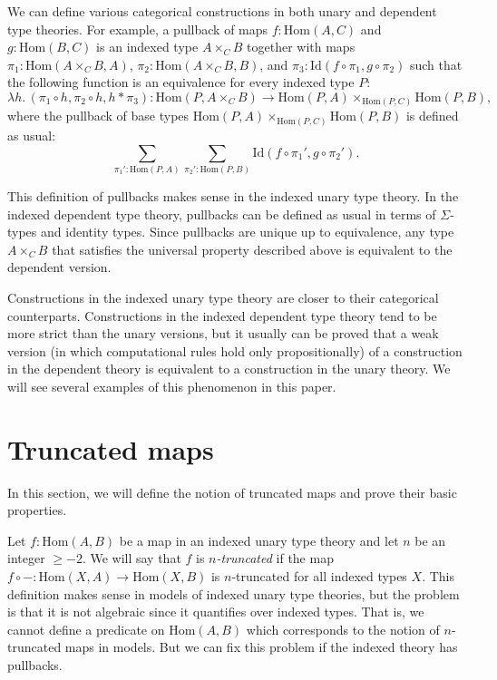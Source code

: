 \documentclass[reqno]{mscs}
\newcommand{\fs}[1]{\mathrm{#1}}
\newcommand{\Hom}{\fs{Hom}}
\newcommand{\Id}{\fs{Id}}
\numberwithin{figure}{section}
\begin{document}
We can define various categorical constructions in both unary and dependent type theories.
For example, a pullback of maps $f : \Hom(A,C)$ and $g : \Hom(B,C)$ is an indexed type $A \times_C B$ together with maps $\pi_1 : \Hom(A \times_C B, A)$, $\pi_2 : \Hom(A \times_C B, B)$, and $\pi_3 : \Id(f \circ \pi_1, g \circ \pi_2)$
such that the following function is an equivalence for every indexed type $P$:
\[ \lambda h.\,(\pi_1 \circ h, \pi_2 \circ h, h * \pi_3) : \Hom(P, A \times_C B) \to \Hom(P,A) \times_{\Hom(P,C)} \Hom(P,B), \]
where the pullback of base types $\Hom(P,A) \times_{\Hom(P,C)} \Hom(P,B)$ is defined as usual:
\[ \sum_{\pi_1' : \Hom(P,A)} \sum_{\pi_2' : \Hom(P,B)} \Id(f \circ \pi_1', g \circ \pi_2'). \]

This definition of pullbacks makes sense in the indexed unary type theory.
In the indexed dependent type theory, pullbacks can be defined as usual in terms of $\Sigma$-types and identity types.
Since pullbacks are unique up to equivalence, any type $A \times_C B$ that satisfies the universal property described above is equivalent to the dependent version.

Constructions in the indexed unary type theory are closer to their categorical counterparts.
Constructions in the indexed dependent type theory tend to be more strict than the unary versions,
but it usually can be proved that a weak version (in which computational rules hold only propositionally) of a construction in the dependent theory is equivalent to a construction in the unary theory.
We will see several examples of this phenomenon in this paper.

\section{Truncated maps}
\label{sec:truncated}

In this section, we will define the notion of truncated maps and prove their basic properties.

Let $f : \Hom(A,B)$ be a map in an indexed unary type theory and let $n$ be an integer $\geq -2$.
We will say that $f$ is \emph{$n$-truncated} if the map $f \circ - : \Hom(X,A) \to \Hom(X,B)$ is $n$-truncated for all indexed types $X$.
This definition makes sense in models of indexed unary type theories, but the problem is that it is not algebraic since it quantifies over indexed types.
That is, we cannot define a predicate on $\Hom(A,B)$ which corresponds to the notion of $n$-truncated maps in models.
But we can fix this problem if the indexed theory has pullbacks.
\end{document}
